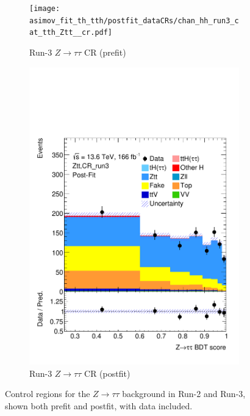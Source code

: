 \begin{figure}[h]
  \begin{subfigure}[t]{0.45\textwidth}
    \centering
    \texttt{[image: asimov\_fit\_th\_tth/postfit\_dataCRs/chan\_hh\_run3\_cat\_tth\_Ztt\_\_cr.pdf]}
    \caption{Run-3 $Z\to\tau\tau$ CR (prefit)}
  \end{subfigure}
  \hfill
  \begin{subfigure}[t]{0.45\textwidth}
    \centering
    \includegraphics[width=\linewidth]{images/asimov_fit_th_tth/postfit_dataCRs/chan_hh_run3_cat_tth_Ztt__cr_postFit.pdf}
    \caption{Run-3 $Z\to\tau\tau$ CR (postfit)}
  \end{subfigure}

  \caption{Control regions for the $Z\to\tau\tau$ background in Run-2 and Run-3, shown both prefit and postfit, with data included.}
  \label{fig:ztt_crs}
\end{figure}

